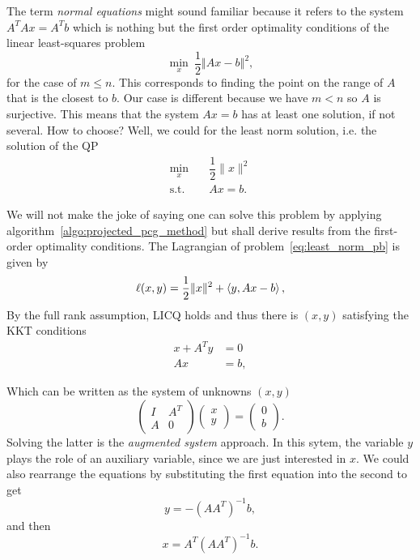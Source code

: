 \documentclass[10pt]{article}
\numberwithin{equation}{section}
\begin{document}
	 
	 The term \textit{normal equations} might sound familiar because it refers to the system $A^TAx=A^Tb$ which is nothing but the first order optimality conditions of the linear least-squares problem
	 \begin{equation}\label{eq:linear_least_squares}
	 	\min_x\ \dfrac{1}{2} \left\Vert Ax-b\right\Vert^2,
	 \end{equation} 
	 for the case of $m\le n$. This corresponds to finding the point on the range of $A$ that is the closest to $b$. Our case is different because we have $m < n$ so $A$ is surjective. This means that the system $Ax=b$ has at least one solution, if not several. How to choose? Well, we could for the least norm solution, i.e. the solution of the QP
	 \begin{equation}\label{eq:least_norm_pb}
	 	\begin{aligned}
	 		\min_x & \quad \dfrac{1}{2}\|x\|^2 \\
	 		\text{s.t.} & \quad Ax=b.
	 	\end{aligned}
	 \end{equation}
	 
	 We will not make the joke of saying one can solve this problem by applying algorithm~\ref{algo:projected_pcg_method} but shall derive results from the first-order optimality conditions. The Lagrangian of problem~\eqref{eq:least_norm_pb} is given by
	 \[\ell(x,y) = \dfrac{1}{2}\|x\|^2 + \left\langle {y} , {Ax-b} \right\rangle,\]
	 By the full rank assumption, LICQ holds and thus there is $(x,y)$ satisfying the KKT conditions
	 \begin{align*}
	 	x + A^Ty &= 0 \\
	 	Ax &= b,
	 \end{align*} 
	 
	 Which can be written as the system of unknowns $(x,y)$
	 \[\begin{pmatrix}
	 	I & A^T \\
	 	A & 0
	 \end{pmatrix} \begin{pmatrix}
	 	x \\ y 
	 \end{pmatrix} = \begin{pmatrix}
	 	0 \\ b
	 \end{pmatrix}.\]
	 Solving the latter is the \textit{augmented system} approach. In this sytem, the variable $y$ plays the role of an auxiliary variable, since we are just interested in $x$. We could also rearrange the equations by substituting the first equation into the second to get
	 \[y=-(AA^T)^{-1}b,\]
	 and then 
	 \[x = A^T(AA^T)^{-1}b.\]
	 
\end{document}
